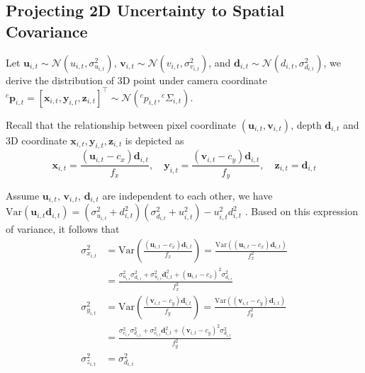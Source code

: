 \subsection{Projecting 2D Uncertainty to Spatial Covariance}
\label{sec:macvo:Project2DTo3D}

Let $\mathbf{u}_{i, t} \sim \mathcal{N}(u_{i, t}, \sigma_{u_{i, t}}^2)$, $\mathbf{v}_{i, t} \sim \mathcal{N}(v_{i, t}, \sigma_{v_{i, t}}^2)$, and $\mathbf{d}_{i, t} \sim \mathcal{N}(d_{i, t}, \sigma_{d_{i, t}}^2)$, we derive the distribution of 3D point under camera coordinate ${}^c\mathbf{p}_{i, t} = [\mathbf{x}_{i, t}, \mathbf{y}_{i, t}, \mathbf{z}_{i, t}]^\top \sim \mathcal{N}({}^cp_{i, t}, {}^c\Sigma_{i, t})$.

Recall that the relationship between pixel coordinate $(\mathbf{u}_{i, t}, \mathbf{v}_{i, t})$, depth $\mathbf{d}_{i, t}$ and 3D coordinate $\mathbf{x}_{i, t}, \mathbf{y}_{i, t}, \mathbf{z}_{i, t}$ is depicted as
\begin{equation}
    \mathbf{x}_{i, t} = \frac{(\mathbf{u}_{i, t} - c_x)\mathbf{d}_{i, t}}{f_x},\quad \mathbf{y}_{i, t} = \frac{(\mathbf{v}_{i, t} - c_y)\mathbf{d}_{i, t}}{f_y},\quad \mathbf{z}_{i, t} = \mathbf{d}_{i, t}
\end{equation}

Assume $\mathbf{u}_{i, t}$, $\mathbf{v}_{i, t}$, $\mathbf{d}_{i, t}$ are independent to each other, we have $\mathrm{Var}(\mathbf{u}_{i, t}\mathbf{d}_{i, t}) = (\sigma_{u_{i, t}}^2 + d_{i, t}^2)(\sigma_{d_{i, t}}^2 + u_{i, t}^2) - u_{i, t}^2d_{i, t}^2$  \cite{ExactVarianceProduct}. Based on this expression of variance, it follows that
\begin{equation}
\begin{aligned}
    \sigma_{x_{i, t}}^2 &= \mathrm{Var}\left(\frac{(\mathbf{u}_{i, t} - c_x)\mathbf{d}_{i, t}}{f_x} \right) = \frac{\mathrm{Var}((\mathbf{u}_{i, t} - c_x)\mathbf{d}_{i, t})}{f_x^2}\\
        &= \frac{\sigma_{u_{i, t}}^2\sigma_{d_{i, t}}^2 + \sigma_{u_{i, t}}^2\mathbf{d}_{i, t}^2 + (\mathbf{u}_{i, t} - c_x)^2\sigma_{d_{i, t}}^2}{f_x^2}\\
    \sigma_{y_{i, t}}^2 &= \mathrm{Var}\left(\frac{(\mathbf{v}_{i, t} - c_y)\mathbf{d}_{i, t}}{f_y} \right) = \frac{\mathrm{Var}((\mathbf{v}_{i, t} - c_y)\mathbf{d}_{i, t})}{f_y^2}\\
        &= \frac{\sigma_{v_{i, t}}^2\sigma_{d_{i, t}}^2 + \sigma_{v_{i, t}}^2\mathbf{d}_{i, t}^2 + (\mathbf{v}_{i, t} - c_y)^2\sigma_{d_{i, t}}^2}{f_y^2}\\
    \sigma_{z_{i, t}}^2 &= \sigma_{d_{i, t}}^2
\end{aligned}
\end{equation}

